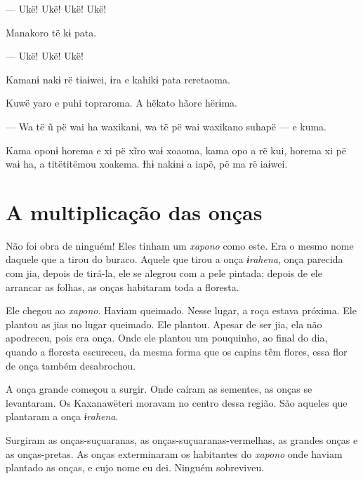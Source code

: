 --- Ukë! Ukë! Ukë! Ukë! 

Manakoro të kɨ pata. 

--- Ukë! Ukë! Ukë! 

Kamanɨ nakɨ rë tɨaɨwei, ɨra e kahikɨ pata reretaoma. 


Kuwë yaro e puhi topraroma. A hẽkato hãore hërɨma. 

--- Wa të ũ pë wai ha waxikanɨ, wa të pë wai waxikano suhapë --- e
kuma. 

Kama oponɨ horema e xi pë xĩro waɨ xoaoma, kama opo a rë kui, horema xi
pë waɨ ha, a titëtitëmou xoakema. Ɨhɨ nakɨnɨ a iapë, pë ma rë iaɨwei. 

 
\chapter{A multiplicação das onças}

 

Não foi obra de ninguém! Eles tinham um \textit{xapono} como este. Era o mesmo nome
daquele que a tirou do buraco. Aquele que tirou a onça \textit{ɨrahena},
onça parecida com jia, depois de tirá-la, ele se alegrou com a pele
pintada; depois de ele arrancar as folhas, as onças habitaram toda a
floresta. 

Ele chegou ao \textit{xapono}. Haviam queimado. Nesse lugar, a roça estava
próxima. Ele plantou as jias no lugar queimado. Ele plantou. Apesar de
ser jia, ela não apodreceu, pois era onça. Onde ele plantou um pouquinho,
ao final do dia, quando a floresta escureceu, da mesma forma que os
capins têm flores, essa flor de onça também desabrochou. 

A onça grande começou a surgir. Onde caíram as sementes, as onças se
levantaram. Os Kaxanawëteri moravam no centro dessa região. São aqueles
que plantaram a onça \textit{ɨrahena}. 

Surgiram as onças-suçuaranas, as onças-suçuaranas-vermelhas, as grandes
onças e as onças-pretas. As onças exterminaram os habitantes do \textit{xapono}
onde haviam plantado as onças, e cujo nome eu dei. Ninguém sobreviveu. 

